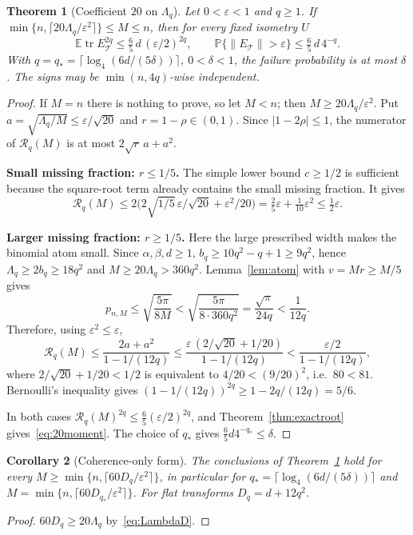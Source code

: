 \documentclass[11pt,a4paper]{article}
\newtheorem{theorem}{Theorem}[section]
\newtheorem{corollary}[theorem]{Corollary}
\theoremstyle{definition}
\theoremstyle{remark}
\numberwithin{equation}{section}
\newcommand{\E}{\mathbb E}
\newcommand{\Prob}{\mathbb P}
\newcommand{\tr}{\operatorname{tr}}
\newcommand{\eps}{\varepsilon}
\newcommand{\norm}[1]{\lVert#1\rVert}
\newcommand{\cT}{\mathcal T}
\newcommand{\Rex}{\mathcal R}
\begin{document}
\begin{theorem}[Coefficient $20$ on $\Lambda_q$]\label{thm:20}
Let $0<\eps<1$ and $q\ge1$. If $\min\{n,\lceil20\Lambda_q/\eps^2\rceil\}\le M\le n$,
then for every fixed isometry $U$
\begin{equation}\label{eq:20moment}
 \E\tr E_\cT^{2q}\le\tfrac65\,d\,(\eps/2)^{2q},\qquad
 \Prob\{\norm{E_\cT}>\eps\}\le\tfrac65\,d\,4^{-q}.
\end{equation}
With $q=q_*=\lceil\log_4(6d/(5\delta))\rceil$, $0<\delta<1$, the failure
probability is at most $\delta$. The signs may be $\min(n,4q)$-wise independent.
\end{theorem}
\begin{proof}
If $M=n$ there is nothing to prove, so let $M<n$; then
$M\ge20\Lambda_q/\eps^2$. Put $a=\sqrt{\Lambda_q/M}\le\eps/\sqrt{20}$ and
$r=1-\rho\in(0,1)$. Since $|1-2\rho|\le1$, the numerator of $\Rex_q(M)$ is at
most $2\sqrt r\,a+a^2$.

\noindent\textbf{Small missing fraction: $r\le1/5$.}\enspace
The simple lower bound $c\ge1/2$ is sufficient because the square-root term
already contains the small missing fraction. It gives
\[
 \Rex_q(M)\le2\bigl(2\sqrt{1/5}\,\eps/\sqrt{20}+\eps^2/20\bigr)
 =\tfrac25\eps+\tfrac1{10}\eps^2\le\tfrac12\eps .
\]

\noindent\textbf{Larger missing fraction: $r\ge1/5$.}\enspace
Here the large prescribed width makes the binomial atom small. Since
$\alpha,\beta,d\ge1$,
$b_q\ge10q^2-q+1\ge9q^2$, hence $\Lambda_q\ge2b_q\ge18q^2$ and
$M\ge20\Lambda_q>360q^2$. Lemma~\ref{lem:atom} with $v=Mr\ge M/5$ gives
\[
 p_{n,M}\le\sqrt{\frac{5\pi}{8M}}<\sqrt{\frac{5\pi}{8\cdot360q^2}}
 =\frac{\sqrt\pi}{24q}<\frac1{12q}.
\]
Therefore, using $\eps^2\le\eps$,
\[
 \Rex_q(M)\le\frac{2a+a^2}{1-1/(12q)}
 \le\frac{\eps\,(2/\sqrt{20}+1/20)}{1-1/(12q)}
 <\frac{\eps/2}{1-1/(12q)} ,
\]
where $2/\sqrt{20}+1/20<1/2$ is equivalent to $4/20<(9/20)^2$, i.e.\ $80<81$.
Bernoulli's inequality gives $(1-1/(12q))^{2q}\ge1-2q/(12q)=5/6$.

In both cases $\Rex_q(M)^{2q}\le\frac65(\eps/2)^{2q}$, and
Theorem~\ref{thm:exactroot} gives~\eqref{eq:20moment}. The choice of $q_*$
gives $\frac65d4^{-q_*}\le\delta$.
\end{proof}

\begin{corollary}[Coherence-only form]\label{cor:60}
The conclusions of Theorem~\ref{thm:20} hold for every
$M\ge\min\{n,\lceil60D_q/\eps^2\rceil\}$, in particular for
$q_*=\lceil\log_4(6d/(5\delta))\rceil$ and $M=\min\{n,\lceil60D_{q_*}/\eps^2\rceil\}$.
For flat transforms $D_q=d+12q^2$.
\end{corollary}
\begin{proof}
$60D_q\ge20\Lambda_q$ by~\eqref{eq:LambdaD}.
\end{proof}
\end{document}
